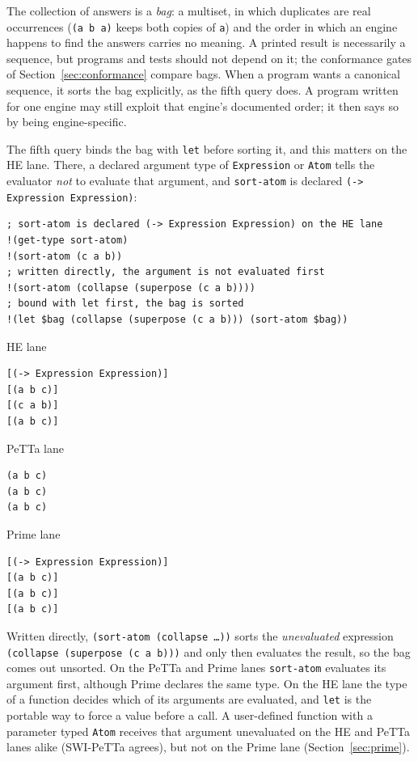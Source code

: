 \documentclass[11pt]{article}
\newcommand{\code}[1]{\texttt{#1}}
\newcommand{\outhead}[1]{{\footnotesize\sffamily #1}\par\vspace{1pt}}
\newcommand{\PeTTa}{\textup{PeTTa}}
\newcommand{\HE}{\textup{HE}}
\begin{document}
\noindent
The collection of answers is a \emph{bag}: a multiset, in which duplicates are
real occurrences (\code{(a b a)} keeps both copies of \code{a}) and the order
in which an engine happens to find the answers carries no meaning.  A printed
result is necessarily a sequence, but programs and tests should not depend on
it; the conformance gates of Section~\ref{sec:conformance} compare bags.  When
a program wants a canonical sequence, it sorts the bag explicitly, as the
fifth query does.  A program written for one engine may still exploit that
engine's documented order; it then says so by being engine-specific.

The fifth query binds the bag with \code{let} before sorting it, and this
matters on the \HE{} lane.  There, a declared argument type of
\code{Expression} or \code{Atom} tells the evaluator \emph{not} to evaluate
that argument, and \code{sort-atom} is declared
\code{(-> Expression Expression)}:

\begin{lstlisting}[style=metta,caption={Argument types decide evaluation on the HE lane},label={lst:t02b}]
; sort-atom is declared (-> Expression Expression) on the HE lane
!(get-type sort-atom)
!(sort-atom (c a b))
; written directly, the argument is not evaluated first
!(sort-atom (collapse (superpose (c a b))))
; bound with let first, the bag is sorted
!(let $bag (collapse (superpose (c a b))) (sort-atom $bag))
\end{lstlisting}
\noindent\begin{minipage}[t]{0.32\textwidth}
\outhead{HE lane}
\begin{lstlisting}[style=out]
[(-> Expression Expression)]
[(a b c)]
[(c a b)]
[(a b c)]
\end{lstlisting}
\end{minipage}\hfill
\begin{minipage}[t]{0.32\textwidth}
\outhead{PeTTa lane}
\begin{lstlisting}[style=out]
%Undefined%
(a b c)
(a b c)
(a b c)
\end{lstlisting}
\end{minipage}\hfill
\begin{minipage}[t]{0.32\textwidth}
\outhead{Prime lane}
\begin{lstlisting}[style=out]
[(-> Expression Expression)]
[(a b c)]
[(a b c)]
[(a b c)]
\end{lstlisting}
\end{minipage}

\noindent
Written directly, \code{(sort-atom (collapse \ldots))} sorts the
\emph{unevaluated} expression \code{(collapse (superpose (c a b)))} and only
then evaluates the result, so the bag comes out unsorted.  On the \PeTTa{}
and Prime lanes \code{sort-atom} evaluates its argument first, although Prime
declares the same type.  On the \HE{}
lane the type of a function decides which of its arguments are evaluated, and
\code{let} is the portable way to force a value before a call.  A
user-defined function with a parameter typed \code{Atom} receives that
argument unevaluated on the \HE{} and \PeTTa{} lanes alike (SWI-\PeTTa{}
agrees), but not on the Prime lane (Section~\ref{sec:prime}).
\end{document}
